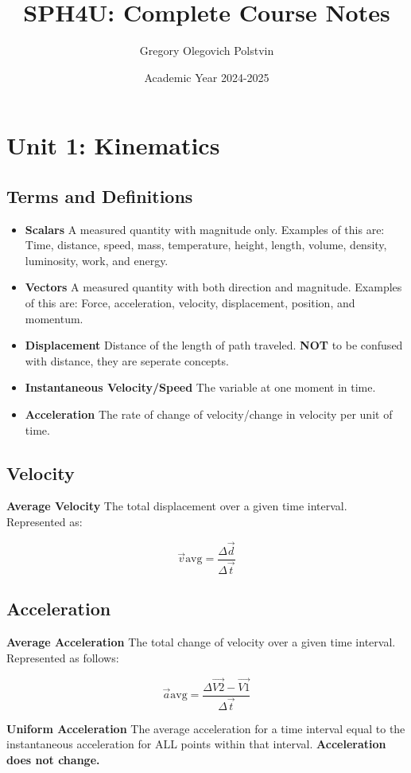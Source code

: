 \documentclass[12pt, oneside]{article}
\title{\bf{SPH4U: Complete Course Notes}}
\author{Gregory Olegovich Polstvin}
\date{Academic Year 2024-2025}
\begin{document}
\maketitle
\tableofcontents

\vspace{.25in}

\section{Unit 1: Kinematics}

\subsection{Terms and Definitions}

\begin{itemize}
  \item {\bf Scalars} A measured quantity with magnitude only. Examples
of this are: Time, distance, speed, mass, temperature, height, length,
volume, density, luminosity, work, and energy.

  \item {\bf Vectors} A measured quantity with both direction and magnitude.
Examples of this are: Force, acceleration, velocity, displacement, 
position, and momentum.

\item {\bf Displacement} Distance of the length of path traveled.
{\bf NOT} to be confused with distance, they are seperate concepts.

\item {\bf Instantaneous Velocity/Speed} The variable at one
moment in time.

\item {\bf Acceleration} The rate of change of velocity/change in velocity
per unit of time.

\end{itemize}

\subsection{Velocity}

{\bf Average Velocity} The total displacement over a given time interval.
Represented as:

\[\vec{v}{\text{avg}}=\frac{\Delta \vec{d}}{\Delta \vec{t}}\]

\subsection{Acceleration}

    {\bf Average Acceleration} The total change of velocity
over a given time interval. Represented as follows:

\[\vec{a}{\text{avg}}=\frac{\Delta \vec{V2} - \vec{V1}}{\Delta \vec{t}}\]

    {\bf Uniform Acceleration} The average acceleration for a time interval
equal to the instantaneous acceleration for ALL points
within that interval. \textbf{Acceleration
does not change.}
\end{document}
